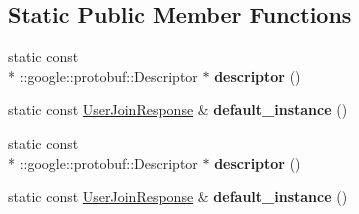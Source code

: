 \subsection*{Static Public Member Functions}
\begin{DoxyCompactItemize}
\item 
\hypertarget{classSimpleChat_1_1UserJoinResponse_a0edb2769e2ef85355cd1d6724bd3b0fd}{static const \\*
\-::google\-::protobuf\-::\-Descriptor $\ast$ {\bfseries descriptor} ()}\label{classSimpleChat_1_1UserJoinResponse_a0edb2769e2ef85355cd1d6724bd3b0fd}

\item 
\hypertarget{classSimpleChat_1_1UserJoinResponse_a4c18ad7705f6ad5eb6b6de0258130100}{static const \hyperlink{classSimpleChat_1_1UserJoinResponse}{User\-Join\-Response} \& {\bfseries default\-\_\-instance} ()}\label{classSimpleChat_1_1UserJoinResponse_a4c18ad7705f6ad5eb6b6de0258130100}

\item 
\hypertarget{classSimpleChat_1_1UserJoinResponse_a0edb2769e2ef85355cd1d6724bd3b0fd}{static const \\*
\-::google\-::protobuf\-::\-Descriptor $\ast$ {\bfseries descriptor} ()}\label{classSimpleChat_1_1UserJoinResponse_a0edb2769e2ef85355cd1d6724bd3b0fd}

\item 
\hypertarget{classSimpleChat_1_1UserJoinResponse_a4c18ad7705f6ad5eb6b6de0258130100}{static const \hyperlink{classSimpleChat_1_1UserJoinResponse}{User\-Join\-Response} \& {\bfseries default\-\_\-instance} ()}\label{classSimpleChat_1_1UserJoinResponse_a4c18ad7705f6ad5eb6b6de0258130100}

\end{DoxyCompactItemize}
